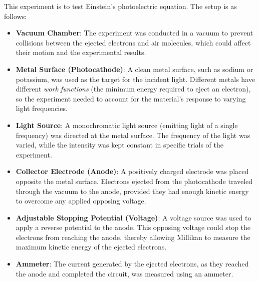 \documentclass[a4paper,12pt]{article}
\begin{document}
This experiment is to test Einstein's photoelectric equation. The setup is as follows:
\begin{itemize}
  \item \textbf{Vacuum Chamber}: The experiment was conducted in a vacuum to prevent collisions between the ejected electrons and air molecules, which could affect their motion and the experimental results.

  \item \textbf{Metal Surface (Photocathode)}: A clean metal surface, such as sodium or potassium, was used as the target for the incident light. Different metals have different \textit{work functions} (the minimum energy required to eject an electron), so the experiment needed to account for the material’s response to varying light frequencies.

  \item \textbf{Light Source}: A monochromatic light source (emitting light of a single frequency) was directed at the metal surface. The frequency of the light was varied, while the intensity was kept constant in specific trials of the experiment.

  \item \textbf{Collector Electrode (Anode)}: A positively charged electrode was placed opposite the metal surface. Electrons ejected from the photocathode traveled through the vacuum to the anode, provided they had enough kinetic energy to overcome any applied opposing voltage.

  \item \textbf{Adjustable Stopping Potential (Voltage)}: A voltage source was used to apply a reverse potential to the anode. This opposing voltage could stop the electrons from reaching the anode, thereby allowing Millikan to measure the maximum kinetic energy of the ejected electrons.

  \item \textbf{Ammeter}: The current generated by the ejected electrons, as they reached the anode and completed the circuit, was measured using an ammeter.
\end{itemize}
\end{document}
